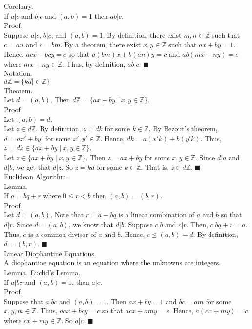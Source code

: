\documentclass[twocolumn]{article}
\newcommand{\qed}{$\blacksquare$}
\newcommand{\integers}{\mathbb{Z}}
\begin{document}
Corollary. \\
If $a | c$ and $b | c$ and $(a, b) = 1$ then $ab | c$. \\
Proof. \\
Suppose $a | c$, $b | c$, and $(a, b) = 1$. By definition, there exist $m, n \in \integers$ such that $c = an$ and $c = bm$. By a theorem, there exist $x, y \in \integers$ such that $ax + by = 1$. Hence, $acx + bcy = c$ so that $a(bm)x + b(an)y = c$ and $ab(mx + ny) = c$ where $mx + ny \in \integers$. Thus, by definition, $ab | c$. \qed \\

Notation. \\
$d\integers = \{ kd \mid \in \integers \}$ \\

Theorem. \\
Let $d = (a, b)$. Then $d\integers = \{ ax + by \mid x, y \in \integers \}$. \\
Proof. \\
Let $(a, b) = d$. \\
Let $z \in d\integers$. By definition, $z = dk$ for some $k \in \integers$. By Bezout's theorem, $d = ax' + by'$ for some $x', y' \in \integers$. Hence, $dk = a(x'k) + b(y'k)$. Thus, $z = dk \in \{ ax + by \mid x, y \in \integers \}$. \\
Let $z \in \{ ax + by \mid x, y \in \integers \}$. Then $z = ax + by$ for some $x, y \in \integers$. Since $d | a$ and $d | b$, we get that $d | z$. So $z = kd$ for some $k \in \integers$. That is, $z \in d\integers$. \qed \\

Euclidean Algorithm. \\

Lemma. \\
If $a = bq + r$ where $0 \leq r < b$ then $(a, b) = (b, r)$. \\
Proof. \\
Let $d = (a, b)$. Note that $r = a - bq$ is a linear combination of $a$ and $b$ so that $d | r$. Since $d = (a, b)$, we know that $d | b$. Suppose $c | b$ and $c | r$. Then, $c | bq + r = a$. Thus, $c$ is a common divisor of $a$ and $b$. Hence, $c \leq (a, b) = d$. By definition, $d = (b, r)$. \qed \\

Linear Diophantine Equations. \\
A diophantine equation is an equation where the unknowns are integers. \\

Lemma. Euclid's Lemma. \\
If $a | bc$ and $(a, b) = 1$, then $a | c$. \\
Proof. \\
Suppose that $a | bc$ and $(a, b) = 1$. Then $ax + by = 1$ and $bc = am$ for some $x, y, m \in \integers$. Thus, $acx + bcy = c$ so that $acx + amy = c$. Hence, $a(cx + my) = c$ where $cx + my \in \integers$. So $a | c$. \qed \\
\end{document}
